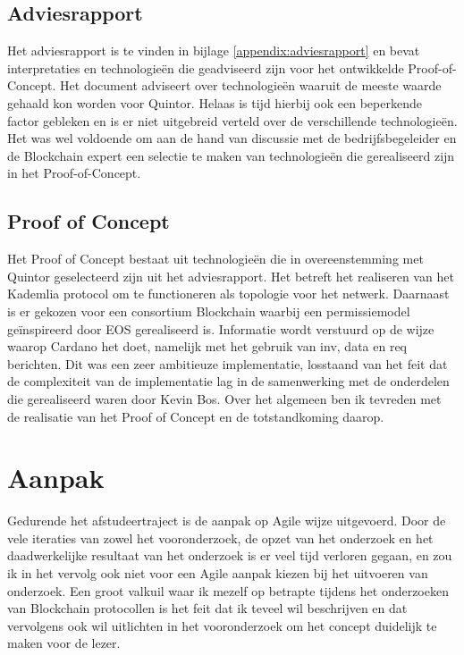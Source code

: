 \newpage
\subsection{Adviesrapport}

Het adviesrapport is te vinden in bijlage \ref{appendix:adviesrapport} en bevat interpretaties en technologieën die geadviseerd zijn voor het ontwikkelde Proof-of-Concept. Het document adviseert over technologieën waaruit de meeste waarde gehaald kon worden voor Quintor. Helaas is tijd hierbij ook een beperkende factor gebleken en is er niet uitgebreid verteld over de verschillende technologieën. Het was wel voldoende om aan de hand van discussie met de bedrijfsbegeleider en de Blockchain expert een selectie te maken van technologieën die gerealiseerd zijn in het Proof-of-Concept.

\subsection{Proof of Concept}

Het Proof of Concept bestaat uit technologieën die in overeenstemming met Quintor geselecteerd zijn uit het adviesrapport. Het betreft het realiseren van het Kademlia protocol om te functioneren als topologie voor het netwerk. Daarnaast is er gekozen voor een consortium Blockchain waarbij een permissiemodel geïnspireerd door EOS gerealiseerd is. Informatie wordt verstuurd op de wijze waarop Cardano het doet, namelijk met het gebruik van inv, data en req berichten. Dit was een zeer ambitieuze implementatie, losstaand van het feit dat de complexiteit van de implementatie lag in de samenwerking met de onderdelen die gerealiseerd waren door Kevin Bos. Over het algemeen ben ik tevreden met de realisatie van het Proof of Concept en de totstandkoming daarop.

\section{Aanpak}

Gedurende het afstudeertraject is de aanpak op Agile wijze uitgevoerd. Door de vele iteraties van zowel het vooronderzoek, de opzet van het onderzoek en het daadwerkelijke resultaat van het onderzoek is er veel tijd verloren gegaan, en zou ik in het vervolg ook niet voor een Agile aanpak kiezen bij het uitvoeren van onderzoek. Een groot valkuil waar ik mezelf op betrapte tijdens het onderzoeken van Blockchain protocollen is het feit dat ik teveel wil beschrijven en dat vervolgens ook wil uitlichten in het vooronderzoek om het concept duidelijk te maken voor de lezer.

